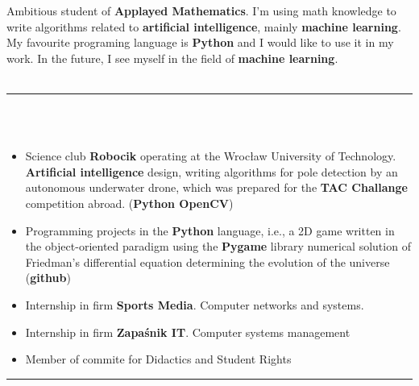 \documentclass[10pt]{article}
\begin{document}
    \begin{minipage}[t]{0.60\textwidth}
        \newline

        \fontsize{10pt}{10pt}
        Ambitious student of \textbf{Applayed Mathematics}. I'm using math 
         knowledge 
        to write algorithms related to \textbf{artificial intelligence},
        mainly \textbf{machine learning}.
        My favourite programing language is \textbf{Python} and I would like to use it in my work. In the future, I see myself in the field of \textbf{machine learning}. \\ \\
        \rule{11cm}{1pt} \\ \\
        \fontsize{10pt}{10pt}
        \begin{itemize}[leftmargin=*]
            \setlength{\parskip}{0pt}
            \item Science club \textbf{Robocik} operating at the Wrocław University of Technology.
            \textbf{Artificial intelligence} design, writing algorithms for pole detection
            by an autonomous underwater drone, which was prepared for the \textbf{TAC Challange}
            competition abroad. (\textbf{Python OpenCV})
            \item Programming projects in the \textbf{Python} language, i.e., a 2D game written
            in the object-oriented paradigm using the \textbf{Pygame} library
            numerical solution of Friedman's differential equation
            determining the evolution of the universe (\textbf{github})
            \item Internship in firm \textbf{Sports Media}. Computer networks and systems.
            \item Internship in firm \textbf{Zapaśnik IT}. Computer systems management
            \item Member of commite for Didactics and Student Rights
        \end{itemize}
        \rule{11cm}{1pt} \\ \\

\end{minipage}
\end{document}
